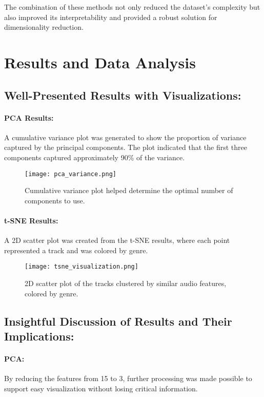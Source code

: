 \documentclass{article}
\begin{document}
The combination of these methods not only reduced the dataset’s complexity but also improved its interpretability and provided a robust solution for dimensionality reduction.

\section{Results and Data Analysis}

\subsection{Well-Presented Results with Visualizations:}
\paragraph{PCA Results:}
A cumulative variance plot was generated to show the proportion of variance captured by the principal components. The plot indicated that the first three components captured approximately 90\% of the variance.

\begin{figure}[h!]
    \centering
    \texttt{[image: pca\_variance.png]}
    \caption{Cumulative variance plot helped determine the optimal number of components to use.}
\end{figure}

\paragraph{t-SNE Results:}
A 2D scatter plot was created from the t-SNE results, where each point represented a track and was colored by genre.

\begin{figure}[h!]
    \centering
    \texttt{[image: tsne\_visualization.png]}
    \caption{2D scatter plot of the tracks clustered by similar audio features, colored by genre.}
\end{figure}

\subsection{Insightful Discussion of Results and Their Implications:}
\paragraph{PCA:}
By reducing the features from 15 to 3, further processing was made possible to support easy visualization without losing critical information.
\end{document}
